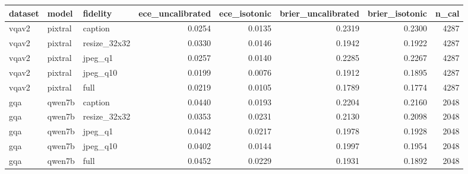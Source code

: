 \begin{tabular}{lllrrrrr}
\toprule
dataset & model & fidelity & ece_uncalibrated & ece_isotonic & brier_uncalibrated & brier_isotonic & n_cal \\
\midrule
vqav2 & pixtral & caption & 0.0254 & 0.0135 & 0.2319 & 0.2300 & 4287 \\
vqav2 & pixtral & resize_32x32 & 0.0330 & 0.0146 & 0.1942 & 0.1922 & 4287 \\
vqav2 & pixtral & jpeg_q1 & 0.0257 & 0.0140 & 0.2285 & 0.2267 & 4287 \\
vqav2 & pixtral & jpeg_q10 & 0.0199 & 0.0076 & 0.1912 & 0.1895 & 4287 \\
vqav2 & pixtral & full & 0.0219 & 0.0105 & 0.1789 & 0.1774 & 4287 \\
gqa & qwen7b & caption & 0.0440 & 0.0193 & 0.2204 & 0.2160 & 2048 \\
gqa & qwen7b & resize_32x32 & 0.0353 & 0.0231 & 0.2130 & 0.2098 & 2048 \\
gqa & qwen7b & jpeg_q1 & 0.0442 & 0.0217 & 0.1978 & 0.1928 & 2048 \\
gqa & qwen7b & jpeg_q10 & 0.0402 & 0.0144 & 0.1997 & 0.1954 & 2048 \\
gqa & qwen7b & full & 0.0452 & 0.0229 & 0.1931 & 0.1892 & 2048 \\
\bottomrule
\end{tabular}
